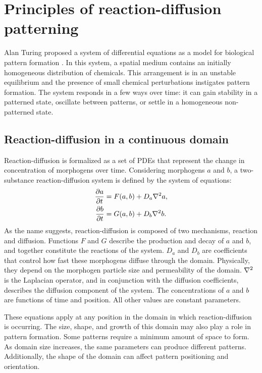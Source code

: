 \chapter{Principles of reaction-diffusion patterning} 
Alan Turing proposed a system of differential equations as a model for biological pattern formation \citep{turing1952}. In this system, a spatial medium contains an initially homogeneous distribution of chemicals. This arrangement is in an unstable equilibrium and the presence of small chemical perturbations instigates pattern formation. The system responds in a few ways over time: it can gain stability in a patterned state, oscillate between patterns, or settle in a homogeneous non-patterned state. 

\section{Reaction-diffusion in a continuous domain}
Reaction-diffusion is formalized as a set of PDEs that represent the change in concentration of morphogens over time. Considering morphogens $a$ and $b$, a two-substance reaction-diffusion system is defined by the system of equations:
	\begin{equation}
	\begin{aligned} \label{eq:basicRD}
		\frac{\partial a}{\partial t} &= F(a, b) + D_a \nabla^2 a,\\
		\frac{\partial b}{\partial t} &= G(a, b) + D_b \nabla^2 b.
	\end{aligned}
	\end{equation}
As the name suggests, reaction-diffusion is composed of two mechanisms, reaction and diffusion. Functions $F$ and $G$ describe the production and decay of $a$ and $b$, and together constitute the reactions of the system. $D_a$ and $D_b$ are coefficients that control how fast these morphogens diffuse through the domain. Physically, they depend on the morphogen particle size and permeability of the domain. $\nabla^2{}$ is the Laplacian operator, and in conjunction with the diffusion coefficients, describes the diffusion component of the system. The concentrations of $a$ and $b$ are functions of time and position. All other values are constant parameters.

These equations apply at any position in the domain in which reaction-diffusion is occurring. The size, shape, and growth of this domain may also play a role in pattern formation. Some patterns require a minimum amount of space to form. As domain size increases, the same parameters can produce different patterns. Additionally, the shape of the domain can affect pattern positioning and orientation.

